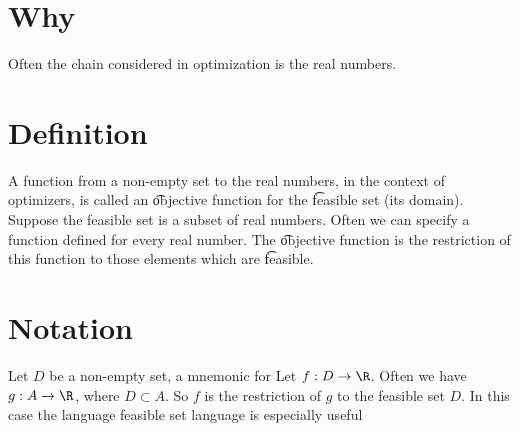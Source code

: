 

\section*{Why}

Often the chain considered in optimization is the real numbers.

\section*{Definition}

A function from a non-empty set to the real numbers, in the context of optimizers, is called an \t{objective function} for the \t{feasible set} (its domain).
Suppose the feasible set is a subset of real numbers.
Often we can specify a function defined for every real number.
The \t{objective function} is the restriction of this function to those elements which are \t{feasible}.

\section*{Notation}

Let $D$ be a non-empty set, a mnemonic for 
Let $f: D \to \R $.
Often we have $g: A \to \R $, where $D \subset A$.
So $f$ is the restriction of $g$ to the feasible set $D$.
In this case the language feasible set language is especially useful


\blankpage